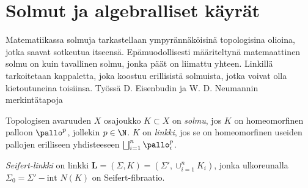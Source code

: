 \section{Solmut ja algebralliset käyrät}

Matematiikassa solmuja tarkastellaan ympyrännäköisinä topologisina olioina, jotka saavat sotkeutua itseensä. Epämuodollisesti määriteltynä matemaattinen solmu on kuin tavallinen solmu, jonka päät on liimattu yhteen. Linkillä tarkoitetaan kappaletta, joka koostuu erillisistä solmuista, jotka voivat olla kietoutuneina toisiinsa. Työssä D. Eisenbudin ja W. D. Neumannin \citep{EN1985} merkintätapoja
\begin{definition}
    Topologisen avaruuden $X$ osajoukko $K\subset X$ on \emph{solmu}, jos $K$ on homeomorfinen palloon $\pallo^p$, jollekin $p\in\N$. $K$ on \emph{linkki}, jos se on homeomorfinen useiden pallojen erilliseen yhdisteeseen $\bigsqcup_{i=1}^n \pallo^p_i$.
\end{definition}
\begin{maaritelma}
    \emph{Seifert-linkki} on linkki $\mathbf L=(\Sigma,K)=(\Sigma',\cup_{i=1}^n K_i)$, jonka ulkoreunalla $\Sigma_0=\Sigma'-\text{int } N(K)$ on Seifert-fibraatio.
\end{maaritelma}